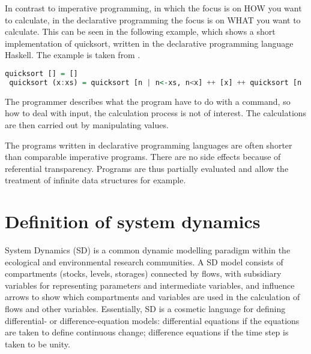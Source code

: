 \par
In contrast to imperative programming, in which the focus is on HOW you want to calculate, in the declarative programming the focus is on WHAT you want to calculate. This can be seen in the following example, which shows a short implementation of quicksort, written in the declarative programming language Haskell. The example is taken from \autocite{appendix:declarative_programming}.
\begin{lstlisting}[language=Haskell]
 quicksort [] = []
 quicksort (x:xs) = quicksort [n | n<-xs, n<x] ++ [x] ++ quicksort [n | n<-xs, n>=x]
\end{lstlisting}
The programmer describes what the program have to do with a command, so how to deal with input, the calculation process is not of interest. The calculations are then carried out by manipulating values.
\par
The programs written in declarative programming languages are often shorter than comparable imperative programs. There are no side effects because of referential transparency. Programs are thus partially evaluated and allow the treatment of infinite data structures for example. \autocite{appendix:hawkins}

\section{Definition of system dynamics}
\par
System Dynamics (SD) is a common dynamic modelling paradigm within the ecological and environmental research communities. A SD model consists of compartments (stocks, levels, storages) connected by flows, with subsidiary variables for representing parameters and intermediate variables, and influence arrows to show which compartments and variables are used in the calculation of flows and other variables. Essentially, SD is a cosmetic language for defining differential- or difference-equation models: differential equations if the equations are taken to define continuous change; difference equations if the time step is taken to be unity. \autocite{appendix:model_paradigm}


